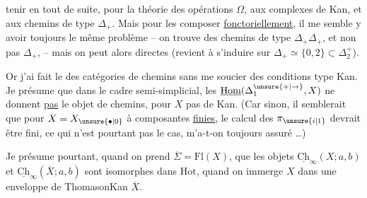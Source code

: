 
tenir en  tout de suite, pour la théorie des opérations $\Omega$, aux complexes de Kan,  et aux chemins de type $\Delta_+$. Mais pour les composer \uline{fonctoriellement}, il me semble y avoir toujours le même problème -- on trouve des chemins de type $\Delta_+\Delta_+$,  et non pas $\Delta_+$, -- mais on peut alors   directes (revient à s'induire sur $\Delta_+\simeq\{0,2\}\subset\Delta_2^+$).

Or j'ai fait le  des catégories de chemins sans me soucier des conditions  type Kan. Je présume que dans le cadre semi-simplicial, les $\underline{\mathrm{Hom}}(\Delta_1^{\unsure{+|\to}},X)$ ne donnent \uline{pas} le  objet de chemins, pour $X$ pas de Kan. (Car sinon, il semblerait que pour $X=X_{\unsure{\bullet|0}}$ à composantes \uline{finies}, le calcul des $\pi_{\unsure{i|1}}$ devrait être fini, ce qui n'est pourtant pas le cas, m'a-t-on toujours assuré \ldots)

Je présume pourtant, quand on prend $\overline\Sigma=\mathrm{Fl}(X)$, que les  objets $\underline{\mathrm{Ch}}_\infty(X;a,b)$ et $\underline{\mathrm{Ch}}_\infty(\overline X;a,b)$ \deleted{\unsure{-}} sont   isomorphes dans $\mathrm{Hot}$, quand on immerge $X$ dans une enveloppe de Thomason\unsure{-| }Kan $\overline X$. 

